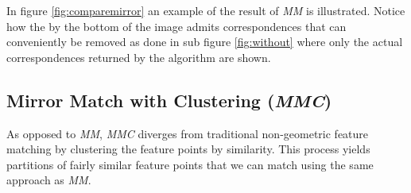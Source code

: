 \documentclass[12pt,journal]{IEEEtran}
\begin{document}
In figure \ref{fig:comparemirror} an example of the result of \emph{MM} 
is illustrated. Notice how the by the bottom of the image admits 
correspondences that can conveniently be removed as done in sub figure 
\ref{fig:without} where only the actual correspondences returned by the 
algorithm are shown.

\subsection{Mirror Match with Clustering (\emph{MMC})}
%
As opposed to \emph{MM}, \emph{MMC} diverges from traditional 
non-geometric feature matching by clustering the feature points by 
similarity. This process yields partitions of fairly similar feature 
points that we can match using the same approach as \emph{MM}. 
%
%
%
%
\end{document}
